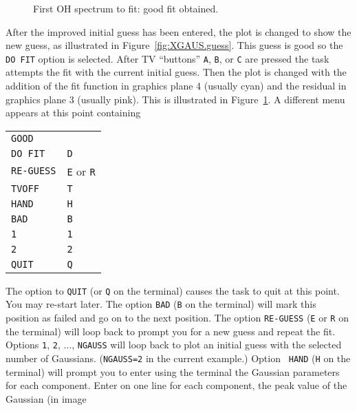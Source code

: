 \documentclass[twoside]{article}
\newcommand{\putfig}[1]{\texttt{[image: \#1.eps]}}
\begin{document}
\begin{figure}
\begin{center}
\resizebox{6.0in}{!}{\putfig{XGAUS.good}}
\caption{First OH spectrum to fit: good fit obtained.}
\label{fig:XGAUS.good}
\end{center}
\end{figure}

After the improved initial guess has been entered, the plot is changed
to show the new guess, as illustrated in Figure~\ref{fig:XGAUS.guess}.
This guess is good so the {\tt DO FIT} option is selected.  After TV
``buttons'' {\tt A}, {\tt B}, or {\tt C} are pressed the task attempts
the fit with the current initial guess.  Then the plot is changed with
the addition of the fit function in graphics plane 4 (usually cyan)
and the residual in graphics plane 3 (usually pink).  This is
illustrated in Figure~\ref{fig:XGAUS.good}.  A different menu appears
at this point containing\\
\begin{center}
\begin{tabular}{|l|l|}\hline
   {\tt GOOD}     & {\tt \hphantom{A}} \\
   {\tt DO FIT}   & {\tt D} \\
   {\tt RE-GUESS} & {\tt E} or {\tt R} \\
   {\tt TVOFF}    & {\tt T} \\
   {\tt HAND}     & {\tt H} \\
   {\tt BAD}      & {\tt B} \\
   {\tt 1}        & {\tt 1} \\
   {\tt 2}        & {\tt 2} \\
   {\tt QUIT}     & {\tt Q} \\ \hline
\end{tabular}
\end{center}
The option to {\tt QUIT} (or {\tt Q} on the terminal) causes the task
to quit at this point.  You may re-start later.  The option {\tt BAD}
({\tt B} on the terminal) will mark this position as failed and go on
to the next position.   The option {\tt RE-GUESS} ({\tt E} or {\tt R}
on the terminal) will loop back to prompt you for a new guess and
repeat the fit.  Options {\tt 1}, {\tt 2}, $\ldots$, {\tt NGAUSS} will
loop back to plot an initial guess with the selected number of
Gaussians.  ({\tt NGAUSS=2} in the current example.)  Option {\tt
  HAND} ({\tt H} on the terminal) will prompt you to enter using the
terminal the Gaussian parameters for each component.  Enter on one
line for each component, the peak value of the Gaussian (in image
\end{document}
